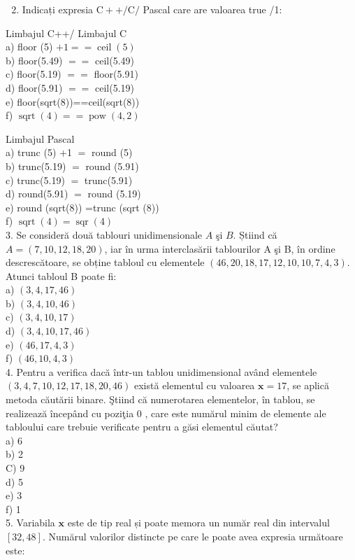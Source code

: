 \begin{enumerate}
  \setcounter{enumi}{1}
  \item Indicați expresia $\mathrm{C}++/ \mathrm{C} /$ Pascal care are valoarea true /1:
\end{enumerate}

Limbajul C++/ Limbajul C\\
a) floor (5) $+1==\operatorname{ceil}(5)$\\
b) floor(5.49) $==$ ceil(5.49)\\
c) floor(5.19) $==$ floor(5.91)\\
d) floor(5.91) $==$ ceil(5.19)\\
e) floor(sqrt(8))==ceil(sqrt(8))\\
f) $\operatorname{sqrt}(4)==\operatorname{pow}(4,2)$

Limbajul Pascal\\
a) trunc (5) +1 $=$ round (5)\\
b) trunc(5.19) $=$ round (5.91)\\
c) trunc(5.19) $=$ trunc(5.91)\\
d) round(5.91) $=$ round (5.19)\\
e) round (sqrt(8)) =trunc (sqrt (8))\\
f) $\operatorname{sqrt}(4)=\operatorname{sqr}(4)$\\
3. Se consideră două tablouri unidimensionale $A$ şi $B$. Știind că $A=(7,10,12,18,20)$, iar în urma interclasării tablourilor A şi B, în ordine descrescătoare, se obține tabloul cu elementele $(46,20,18,17,12,10,10,7,4,3)$. Atunci tabloul B poate fi:\\
a) $(3,4,17,46)$\\
b) $(3,4,10,46)$\\
c) $(3,4,10,17)$\\
d) $(3,4,10,17,46)$\\
e) $(46,17,4,3)$\\
f) $(46,10,4,3)$\\
4. Pentru a verifica dacă într-un tablou unidimensional având elementele $(3,4,7,10,12,17,18,20,46)$ există elementul cu valoarea $\mathbf{x}=17$, se aplică metoda căutării binare. Ştiind că numerotarea elementelor, în tablou, se realizează începând cu poziţia 0 , care este numărul minim de elemente ale tabloului care trebuie verificate pentru a găsi elementul căutat?\\
a) 6\\
b) 2\\
C) 9\\
d) 5\\
e) 3\\
f) 1\\
5. Variabila $\mathbf{x}$ este de tip real și poate memora un număr real din intervalul $[32,48]$. Numărul valorilor distincte pe care le poate avea expresia următoare este:

